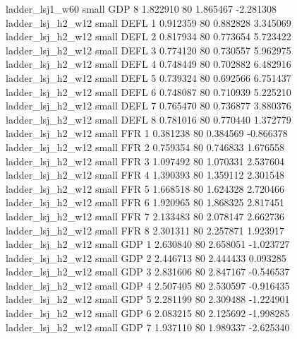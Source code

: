          ladder_lsj1_w60      small      GDP                 8 1.822910 80       1.865467          -2.281308
       ladder_lsj_h2_w12      small     DEFL                 1 0.912359 80       0.882828           3.345069
       ladder_lsj_h2_w12      small     DEFL                 2 0.817934 80       0.773654           5.723422
       ladder_lsj_h2_w12      small     DEFL                 3 0.774120 80       0.730557           5.962975
       ladder_lsj_h2_w12      small     DEFL                 4 0.748449 80       0.702882           6.482916
       ladder_lsj_h2_w12      small     DEFL                 5 0.739324 80       0.692566           6.751437
       ladder_lsj_h2_w12      small     DEFL                 6 0.748087 80       0.710939           5.225210
       ladder_lsj_h2_w12      small     DEFL                 7 0.765470 80       0.736877           3.880376
       ladder_lsj_h2_w12      small     DEFL                 8 0.781016 80       0.770440           1.372779
       ladder_lsj_h2_w12      small      FFR                 1 0.381238 80       0.384569          -0.866378
       ladder_lsj_h2_w12      small      FFR                 2 0.759354 80       0.746833           1.676558
       ladder_lsj_h2_w12      small      FFR                 3 1.097492 80       1.070331           2.537604
       ladder_lsj_h2_w12      small      FFR                 4 1.390393 80       1.359112           2.301548
       ladder_lsj_h2_w12      small      FFR                 5 1.668518 80       1.624328           2.720466
       ladder_lsj_h2_w12      small      FFR                 6 1.920965 80       1.868325           2.817451
       ladder_lsj_h2_w12      small      FFR                 7 2.133483 80       2.078147           2.662736
       ladder_lsj_h2_w12      small      FFR                 8 2.301311 80       2.257871           1.923917
       ladder_lsj_h2_w12      small      GDP                 1 2.630840 80       2.658051          -1.023727
       ladder_lsj_h2_w12      small      GDP                 2 2.446713 80       2.444433           0.093285
       ladder_lsj_h2_w12      small      GDP                 3 2.831606 80       2.847167          -0.546537
       ladder_lsj_h2_w12      small      GDP                 4 2.507405 80       2.530597          -0.916435
       ladder_lsj_h2_w12      small      GDP                 5 2.281199 80       2.309488          -1.224901
       ladder_lsj_h2_w12      small      GDP                 6 2.083215 80       2.125692          -1.998285
       ladder_lsj_h2_w12      small      GDP                 7 1.937110 80       1.989337          -2.625340
